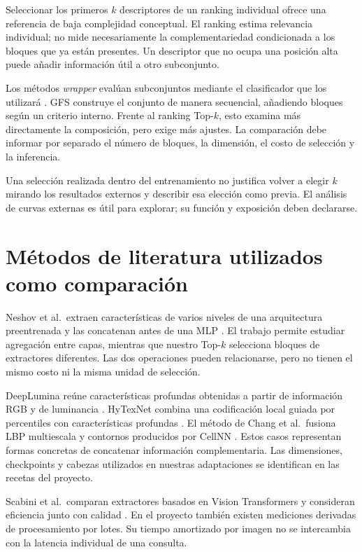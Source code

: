 Seleccionar los primeros \(k\) descriptores de un ranking individual ofrece una referencia de baja complejidad conceptual. El ranking estima relevancia individual; no mide necesariamente la complementariedad condicionada a los bloques que ya están presentes. Un descriptor que no ocupa una posición alta puede añadir información útil a otro subconjunto.

Los métodos \emph{wrapper} evalúan subconjuntos mediante el clasificador que los utilizará \citep{kohavi1997wrappers,guyon2003feature}. GFS construye el conjunto de manera secuencial, añadiendo bloques según un criterio interno. Frente al ranking Top-\(k\), esto examina más directamente la composición, pero exige más ajustes. La comparación debe informar por separado el número de bloques, la dimensión, el costo de selección y la inferencia.

Una selección realizada dentro del entrenamiento no justifica volver a elegir \(k\) mirando los resultados externos y describir esa elección como previa. El análisis de curvas externas es útil para explorar; su función y exposición deben declararse.

\section{Métodos de literatura utilizados como comparación}
Neshov et al.\ extraen características de varios niveles de una arquitectura preentrenada y las concatenan antes de una MLP \citep{neshov2025aggregation}. El trabajo permite estudiar agregación entre capas, mientras que nuestro Top-\(k\) selecciona bloques de extractores diferentes. Las dos operaciones pueden relacionarse, pero no tienen el mismo costo ni la misma unidad de selección.

DeepLumina reúne características profundas obtenidas a partir de información RGB y de luminancia \citep{simon2022deeplumina}. HyTexNet combina una codificación local guiada por percentiles con características profundas \citep{gupta2026hytexnet}. El método de Chang et al.\ fusiona LBP multiescala y contornos producidos por CellNN \citep{chang2024cellnn}. Estos casos representan formas concretas de concatenar información complementaria. Las dimensiones, checkpoints y cabezas utilizados en nuestras adaptaciones se identifican en las recetas del proyecto.

Scabini et al.\ comparan extractores basados en Vision Transformers y consideran eficiencia junto con calidad \citep{scabini2025survey}. En el proyecto también existen mediciones derivadas de procesamiento por lotes. Su tiempo amortizado por imagen no se intercambia con la latencia individual de una consulta.

